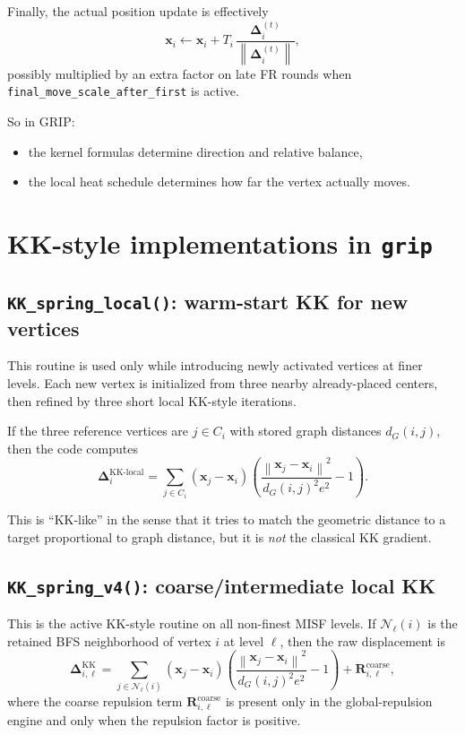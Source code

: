 \documentclass[11pt]{article}
\newcommand{\vect}[1]{\boldsymbol{#1}}
\newcommand{\norm}[1]{\left\lVert #1 \right\rVert}
\begin{document}
Finally, the actual position update is effectively
\[
\vect{x}_i \leftarrow \vect{x}_i + T_i \, \frac{\vect{\Delta}_i^{(t)}}{\norm{\vect{\Delta}_i^{(t)}}},
\]
possibly multiplied by an extra factor on late FR rounds when
\texttt{final\_move\_scale\_after\_first} is active.

So in GRIP:
\begin{itemize}[leftmargin=1.5em]
\item the kernel formulas determine direction and relative balance,
\item the local heat schedule determines how far the vertex actually moves.
\end{itemize}

\section{KK-style implementations in \texttt{grip}}

\subsection{\texttt{KK\_spring\_local()}: warm-start KK for new vertices}

This routine is used only while introducing newly activated vertices at finer
levels. Each new vertex is initialized from three nearby already-placed centers,
then refined by three short local KK-style iterations.

If the three reference vertices are $j \in C_i$ with stored graph distances
$d_G(i,j)$, then the code computes
\[
\vect{\Delta}_i^{\text{KK-local}}
=
\sum_{j \in C_i}
(\vect{x}_j - \vect{x}_i)
\left(
\frac{\norm{\vect{x}_j - \vect{x}_i}^2}{d_G(i,j)^2 e^2}
- 1
\right).
\]

This is ``KK-like'' in the sense that it tries to match the geometric distance
to a target proportional to graph distance, but it is \emph{not} the classical
KK gradient.

\subsection{\texttt{KK\_spring\_v4()}: coarse/intermediate local KK}

This is the active KK-style routine on all non-finest MISF levels. If
$\mathcal{N}_{\ell}(i)$ is the retained BFS neighborhood of vertex $i$ at level
$\ell$, then the raw displacement is
\[
\vect{\Delta}_{i,\ell}^{\text{KK}}
=
\sum_{j \in \mathcal{N}_{\ell}(i)}
(\vect{x}_j - \vect{x}_i)
\left(
\frac{\norm{\vect{x}_j - \vect{x}_i}^2}{d_G(i,j)^2 e^2}
- 1
\right)
+
\vect{R}_{i,\ell}^{\text{coarse}},
\]
where the coarse repulsion term $\vect{R}_{i,\ell}^{\text{coarse}}$ is present
only in the global-repulsion engine and only when the repulsion factor is
positive.
\end{document}

